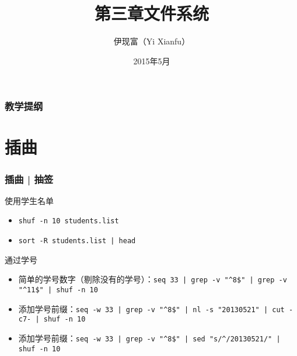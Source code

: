 



\title[文件系统]{第三章\quad 文件系统}
\author[Yixf]{伊现富（Yi Xianfu）}
\date{2015年5月}


\begin{frame}
  \titlepage
\end{frame}

\begin{frame}[plain,label=current]
  \frametitle{教学提纲}
  \setcounter{tocdepth}{3}
  \begin{multicols}{2}
    \tableofcontents
  \end{multicols}
\end{frame}

\section{插曲}
\begin{frame}[fragile]
  \frametitle{插曲 | 抽签}
  \begin{block}{使用学生名单}
    \begin{itemize}
      \item \verb=shuf -n 10 students.list=
      \item \verb=sort -R students.list | head=
    \end{itemize}
  \end{block}
  \pause
  \begin{block}{通过学号}
    \begin{itemize}
      \item 简单的学号数字（剔除没有的学号）：\verb=seq 33 | grep -v "^8$" | grep -v "^11$" | shuf -n 10=
      \item 添加学号前缀：\verb=seq -w 33 | grep -v "^8$" | nl -s "20130521" | cut -c7- | shuf -n 10=
      \item 添加学号前缀：\verb=seq -w 33 | grep -v "^8$" | sed "s/^/20130521/" | shuf -n 10=
    \end{itemize}
  \end{block}
\end{frame}

